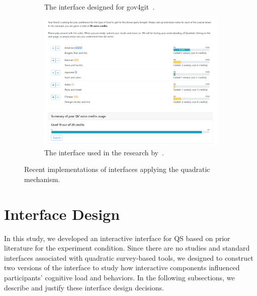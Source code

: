 \begin{figure}[h]
\begin{subfigure}[b]{0.3\textwidth}
        \caption{The interface designed for gov4git~\cite{Gov4gitDecentralizedPlatform2023}.}
        \label{fig:gov4gitInterface}
    \end{subfigure}
    \begin{subfigure}[b]{0.3\textwidth}
        \centering
        \includegraphics[width=\textwidth]{content/image/curr_interface/cheng_qv.png}
        \caption{The interface used in the research by~\textcite{chengCanShowWhat2021}.}
        \label{fig:chengInterface}
    \end{subfigure}
    \caption{Recent implementations of interfaces applying the quadratic mechanism.}
    \label{fig:qv_interface_external}
\end{figure}

\section{Interface Design}
\label{sec:interfaceDesign}
In this study, we developed an interactive interface for QS based on prior literature for the experiment condition. Since there are no studies and standard interfaces associated with quadratic survey-based tools, we designed to construct two versions of the interface to study how interactive components influenced participants' cognitive load and behaviors. In the following subsections, we describe and justify these interface design decisions.

